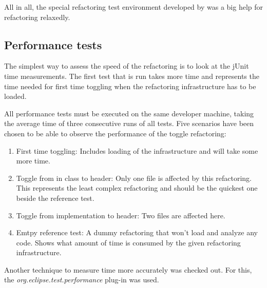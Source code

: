 All in all, the special refactoring test environment developed by \cite{GB06} 
was a big help for refactoring relaxedly.

\subsection{Performance tests}

The simplest way to assess the speed of the refactoring is to look at the jUnit 
time measurements. The first test that is run takes more time and represents the 
time needed for first time toggling when the refactoring infrastructure has to 
be loaded. 

All performance tests must be executed on the same developer machine, taking the 
average time of three consecutive runs of all tests. Five scenarios have been 
chosen to be able to observe the performance of the toggle refactoring:

\begin{enumerate}
\item First time toggling: Includes loading of the infrastructure and will take 
some more time.
\item Toggle from in class to header: Only one file is affected by this 
refactoring. This represents the least complex refactoring and should be the 
quickest one beside the reference test.
\item Toggle from implementation to header: Two files are affected here.
\item Emtpy reference test: A dummy refactoring that won't load and analyze any 
code. Shows what amount of time is consumed by the given refactoring 
infrastructure.
\end{enumerate}

Another technique to measure time more accurately was checked out. For this, the 
\textit{org.eclipse.test.performance} plug-in was used. 



